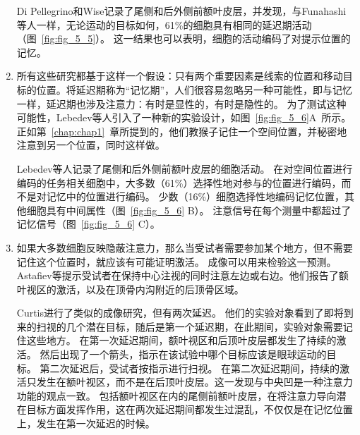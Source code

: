 \begin{enumerate}
	Di Pellegrino和Wise记录了尾侧和后外侧前额叶皮层，并发现，与Funahashi等人一样，无论运动的目标如何，61\%的细胞具有相同的延迟期活动（图~\ref{fig:fig_5_5}）。
	这一结果也可以表明，细胞的活动编码了对提示位置的记忆。
	\item 所有这些研究都基于这样一个假设：只有两个重要因素是线索的位置和移动目标的位置。将延迟期称为“记忆期”，人们很容易忽略另一种可能性，即与记忆一样，延迟期也涉及注意力：有时是显性的，有时是隐性的。
	为了测试这种可能性，Lebedev等人\cite{lebedev2004representation}引入了一种新的实验设计，如图~\ref{fig:fig_5_6}A~所示。
	正如第~\ref{chap:chap1}~章所提到的，他们教猴子记住一个空间位置，并秘密地注意到另一个位置，同时这样做。
	
	Lebedev等人记录了尾侧和后外侧前额叶皮层的细胞活动。
	在对空间位置进行编码的任务相关细胞中，大多数（61\%）选择性地对参与的位置进行编码，而不是对记忆中的位置进行编码。
	少数（16\%）细胞选择性地编码记忆位置，其他细胞具有中间属性（图~\ref{fig:fig_5_6} B）。
	注意信号在每个测量中都超过了记忆信号（图~\ref{fig:fig_5_6} C）。
	\item 如果大多数细胞反映隐蔽注意力，那么当受试者需要参加某个地方，但不需要记住这个位置时，就应该有可能证明激活。
	成像可以用来检验这一预测。
	Astafiev等\cite{astafiev2003functional}提示受试者在保持中心注视的同时注意左边或右边。他们报告了额叶视区的激活，以及在顶骨内沟附近的后顶骨区域。
	
	Curtis\cite{curtis2006selection}进行了类似的成像研究，但有两次延迟。
	他们的实验对象看到了即将到来的扫视的几个潜在目标，随后是第一个延迟期，在此期间，实验对象需要记住这些地方。
	在第一次延迟期间，额叶视区和后顶叶皮层都发生了持续的激活。
	然后出现了一个箭头，指示在该试验中哪个目标应该是眼球运动的目标。
	第二次延迟后，受试者按指示进行扫视。
	在第二次延迟期间，持续的激活只发生在额叶视区，而不是在后顶叶皮层。这一发现与中央凹是一种注意力功能的观点一致。
	包括额叶视区在内的尾侧前额叶皮层，在将注意力导向潜在目标方面发挥作用，这在两次延迟期间都发生过混乱，不仅仅是在记忆位置上，发生在第一次延迟的时候。
\end{enumerate}



